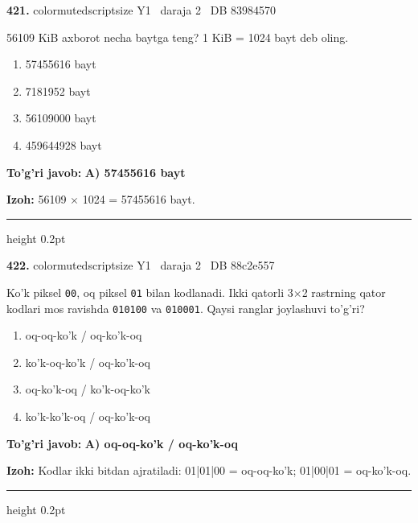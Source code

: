 \documentclass[10pt,a4paper,oneside]{article}
\begin{document}
\noindent\textbf{\color{ink}421.}  {color{muted}scriptsize Y1 \textbullet\ daraja 2 \textbullet\ DB 83984570}
\par
56109 KiB axborot necha baytga teng? 1 KiB = 1024 bayt deb oling.
\begin{enumerate}[label=\Alph*),leftmargin=9mm]
\item 57455616 bayt
\item 7181952 bayt
\item 56109000 bayt
\item 459644928 bayt
\end{enumerate}
\begin{tcolorbox}[enhanced,breakable,colback=teal!4,colframe=teal!50!black,boxrule=0.5pt,arc=1.1mm,left=3mm,right=3mm,top=1.7mm,bottom=1.7mm,before skip=2mm,after skip=2mm]
\textbf{\color{teal}To'g'ri javob:} \textbf{A) 57455616 bayt}
\par\smallskip
\textbf{Izoh:} 56109 \ensuremath{\times} 1024 = 57455616 bayt.
\end{tcolorbox}
\vspace{2mm}\hrule height 0.2pt \vspace{3mm}

\noindent\textbf{\color{ink}422.}  {color{muted}scriptsize Y1 \textbullet\ daraja 2 \textbullet\ DB 88c2e557}
\par
Ko'k piksel \texttt{00}, oq piksel \texttt{01} bilan kodlanadi. Ikki qatorli 3\ensuremath{\times}2 rastrning qator kodlari mos ravishda \texttt{010100} va \texttt{010001}. Qaysi ranglar joylashuvi to'g'ri?
\begin{enumerate}[label=\Alph*),leftmargin=9mm]
\item oq-oq-ko'k / oq-ko'k-oq
\item ko'k-oq-ko'k / oq-ko'k-oq
\item oq-ko'k-oq / ko'k-oq-ko'k
\item ko'k-ko'k-oq / oq-ko'k-oq
\end{enumerate}
\begin{tcolorbox}[enhanced,breakable,colback=teal!4,colframe=teal!50!black,boxrule=0.5pt,arc=1.1mm,left=3mm,right=3mm,top=1.7mm,bottom=1.7mm,before skip=2mm,after skip=2mm]
\textbf{\color{teal}To'g'ri javob:} \textbf{A) oq-oq-ko'k / oq-ko'k-oq}
\par\smallskip
\textbf{Izoh:} Kodlar ikki bitdan ajratiladi: 01|01|00 = oq-oq-ko'k; 01|00|01 = oq-ko'k-oq.
\end{tcolorbox}
\vspace{2mm}\hrule height 0.2pt \vspace{3mm}
\end{document}
